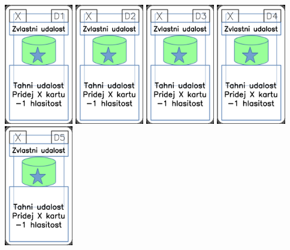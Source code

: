 \documentclass[a4paper]{article}
\begin{document}
	\includegraphics[width=3.0cm]{img-5_15}
	\includegraphics[width=3.0cm]{img-5_16}
	\includegraphics[width=3.0cm]{img-5_17}
	\includegraphics[width=3.0cm]{img-5_18}
	\includegraphics[width=3.0cm]{img-5_19}
\end{document}

